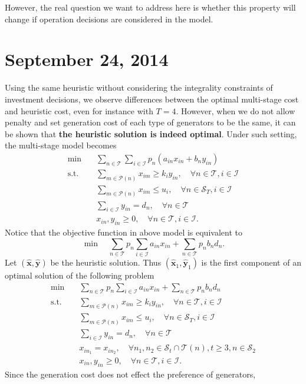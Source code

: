 \documentclass[10pt]{article}
\theoremstyle{plain}
\theoremstyle{definition}
\theoremstyle{remark}
\newcommand{\mcal}{\mathcal}
\newcommand{\subjectto}{\text{s.t.}}
\newcommand{\bx}{\mathbf{x}}
\newcommand{\by}{\mathbf{y}}
\newcommand{\cP}{\mathcal{P}}
\newcommand{\T}{\mathcal{T}}
\begin{document}
However, the real question we want to address here is whether this property will change
if operation decisions are considered in the model.


\section*{September 24, 2014}\label{092414}
Using the same heuristic without considering the integrality constraints of investment decisions,
we observe differences between the optimal multi-stage cost and heuristic cost, even for instance
with $T=4$. However, when we do not allow penalty and set generation cost of each type of
generators to be the same,
it can be shown that {\bf the heuristic solution is indeed optimal}.
Under such setting, the multi-stage model becomes
\begin{align*}
\min \quad & \sum_{n\in \T}\sum_{i\in \mcal{I}}p_n(a_{in}x_{in} + b_{n}y_{in})\\
\subjectto \quad & \sum_{m\in \cP(n)}x_{im} \ge k_iy_{in},\quad \forall n\in \T, i\in \mcal{I}\\
& \sum_{m\in \cP(n)}x_{im} \le u_i, \quad \forall n\in \mcal{S}_T, i\in \mcal{I}\\
& \sum_{i\in \mcal{I}}y_{in} = d_n, \quad \forall n\in \T\\
& x_{in}, y_{in}\ge 0, \quad \forall n\in \T, i\in \mcal{I}.
\end{align*}
Notice that the objective function in above model is equivalent to
\[\min \quad \sum_{n\in \T}p_n\sum_{i\in \mcal{I}}a_{in}x_{in} + \sum_{n\in \T}p_nb_{n}d_n.\]
Let $(\hat{\bx}, \hat{\by})$ be the heuristic solution.
Thus $(\hat{\bx}_1, \hat{\by}_1)$ is the first component of an optimal solution
of the following problem
\begin{align*}
\min \quad & \sum_{n\in \T}p_n\sum_{i\in \mcal{I}}a_{in}x_{in} + \sum_{n\in \T}p_nb_{n}d_n\\
\subjectto \quad & \sum_{m\in \cP(n)}x_{im} \ge k_iy_{in},\quad \forall n\in \T, i\in \mcal{I}\\
& \sum_{m\in \cP(n)}x_{im} \le u_i, \quad \forall n\in \mcal{S}_T, i\in \mcal{I}\\
& \sum_{i\in \mcal{I}}y_{in} = d_n, \quad \forall n\in \T\\
& x_{in_1} = x_{in_2}, \quad \forall n_1,n_2\in \mcal{S}_t\cap \T(n), t\ge 3, n\in \mcal{S}_2\\
& x_{in}, y_{in}\ge 0, \quad \forall n\in \T, i\in \mcal{I}.
\end{align*}
Since the generation cost does not effect the preference of generators,
\end{document}
